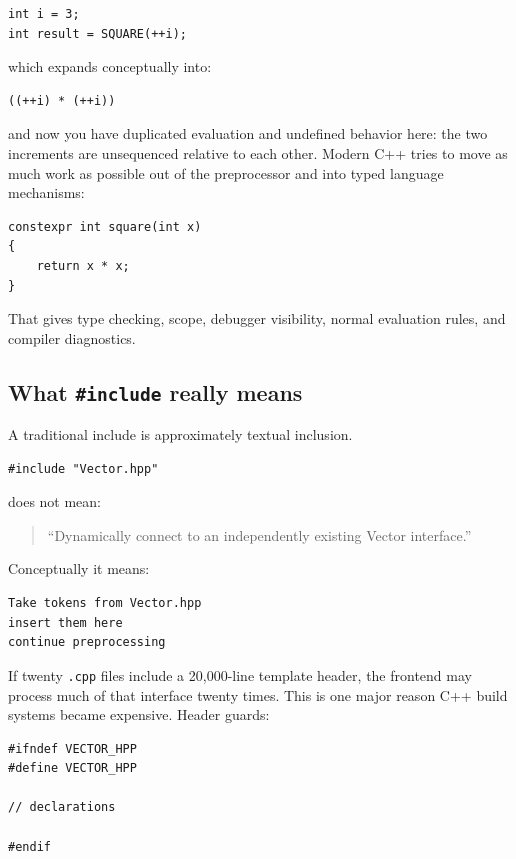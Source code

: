 \begin{verbatim}
int i = 3;
int result = SQUARE(++i);
\end{verbatim}

which expands conceptually into:

\begin{verbatim}
((++i) * (++i))
\end{verbatim}

and now you have duplicated evaluation and undefined behavior here: the two increments are unsequenced relative to each other. Modern C++ tries to move as much work as possible out of the preprocessor and into typed language mechanisms:

\begin{verbatim}
constexpr int square(int x)
{
    return x * x;
}
\end{verbatim}

That gives type checking, scope, debugger visibility, normal evaluation rules, and compiler diagnostics.

\subsection{\texorpdfstring{What \texttt{\#include} really means}{What \#include really means}}\label{05-engine-i-ch002-what-include-really-means}

A traditional include is approximately textual inclusion.

\begin{verbatim}
#include "Vector.hpp"
\end{verbatim}

does not mean:

\begin{quote}
``Dynamically connect to an independently existing Vector interface.''
\end{quote}

Conceptually it means:

\begin{verbatim}
Take tokens from Vector.hpp
insert them here
continue preprocessing
\end{verbatim}

If twenty \texttt{.cpp} files include a 20,000-line template header, the frontend may process much of that interface twenty times. This is one major reason C++ build systems became expensive. Header guards:

\begin{verbatim}
#ifndef VECTOR_HPP
#define VECTOR_HPP

// declarations

#endif
\end{verbatim}

